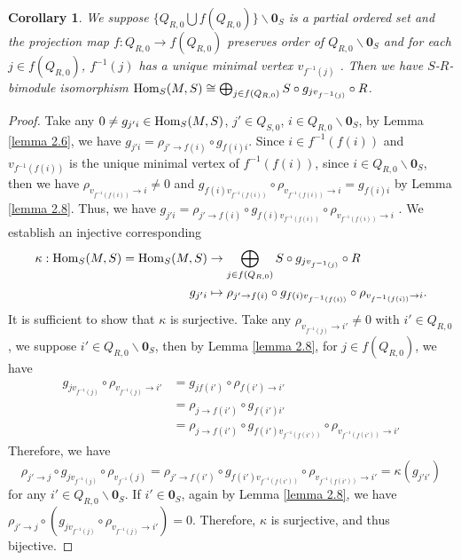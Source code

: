 \documentclass[a4paper, reqno]{amsart}
\newtheorem{cor}[thm]{Corollary}
\theoremstyle{definition}
\theoremstyle{remark}
\numberwithin{equation}{section}
\def\Hom{{\rm Hom}}
\begin{document}
\begin{cor} \label{cor 2.8}
    We suppose $\{Q_{R,0}\bigcup f(Q_{R,0})\}\backslash \mathbf{0}_S $ is a partial ordered set and the projection map $f:Q_{R,0}\to f(Q_{R,0})$ preserves order of $Q_{R,0}\backslash \mathbf{0}_S$ and for each $j\in f(Q_{R,0})$,  ${f^{-1}(j)}$ has a unique minimal vertex $v_{f^{-1}(j)}$ 
 .  Then we have $S$-$R$-bimodule isomorphism $\textup{Hom}_S(M,S) \cong \bigoplus_{j\in f(Q_{R,0})} S \circ g_{jv_{f^{-1}(j)}} \circ R $.
\end{cor}

\begin{proof}
    Take any $0 \neq g_{j'i} \in \textup{Hom}_S(M,S) $, $j'\in Q_{S,0}$, $i\in Q_{R,0}\backslash{\mathbf{0}_S}$, by Lemma \ref{lemma 2.6}, we have $ g_{j'i} = \rho_{j'\to f(i)}\circ g_{f(i)i}$. Since $ i\in f^{-1}(f(i))$ and $ v_{f^{-1}(f(i))}$ is the unique minimal vertex of $ f^{-1}(f(i))$, since $i\in Q_{R,0}\backslash \mathbf{0}_S$, then we have $\rho_{v_{f^{-1}(f(i))}\to i} \neq 0$ and  $g_{f(i)v_{f^{-1}(f(i))}} \circ \rho_{v_{f^{-1}(f(i))}\to i} = g_{f(i)i}$ by Lemma \ref{lemma 2.8}. Thus, we have $ g_{j'i} = \rho_{j'\to f(i)}\circ g_{f(i)v_{f^{-1}(f(i))}} \circ \rho_{v_{f^{-1}(f(i))}\to i }$ . We establish an injective corresponding 
    \begin{align*}
        \kappa : \textup{Hom}_S(M,S) = \Hom_{S}(M,S) &\to \bigoplus_{j\in f(Q_{R,0})} S \circ g_{jv_{f^{-1}(j)}}\circ R \\
        g_{j'i} &\mapsto  \rho_{j'\to f(i)} \circ g_{f(i)v_{f^{-1}(f(i))}} \circ \rho_{v_{f^{-1}(f(i))}\to i }.
    \end{align*}
   It is sufficient to show that $\kappa$ is surjective. Take any $\rho_{v_{f^{-1}(j)}\to i'}\neq 0$ with $i'\in Q_{R,0}$, we suppose $i'\in Q_{R,0}\backslash \mathbf{0}_S$, then by Lemma \ref{lemma 2.8}, for $j\in f(Q_{R,0})$, we have
   \begin{align*}
         g_{jv_{f^{-1}(j)}} \circ \rho_{v_{f^{-1}(j)}\to i'} 
        &= g_{jf(i')} \circ \rho_{f(i')\to i'}\\
        & = \rho_{j\to f(i')} \circ g_{f(i') i'} \\
        &=  \rho_{j\to f(i')} \circ g_{f(i')v_{f^{-1}(f(i'))}} \circ \rho_{v_{f^{-1}(f(i'))}\to i'}
    \end{align*}
   Therefore, we have
   $$\rho_{j'\to j}\circ g_{jv_{f^{-1}(j)}}\circ \rho_{v_{f^{-1}}(j)} = \rho_{j'\to f(i')}\circ g_{f(i')v_{f^{-1}(f(i'))}} \circ \rho_{v_{f^{-1}(f(i'))}\to i'} = \kappa(g_{j'i'})$$ for any $i'\in Q_{R,0}\backslash \mathbf{0}_S$. If $i'\in \mathbf{0}_S$, again by Lemma \ref{lemma 2.8}, we have $\rho_{j'\to j}\circ (g_{jv_{f^{-1}(j)}}\circ \rho_{v_{f^{-1}(j)}\to i'}) = 0 $. Therefore, $\kappa$ is surjective, and thus bijective.   
\end{proof}
\end{document}
